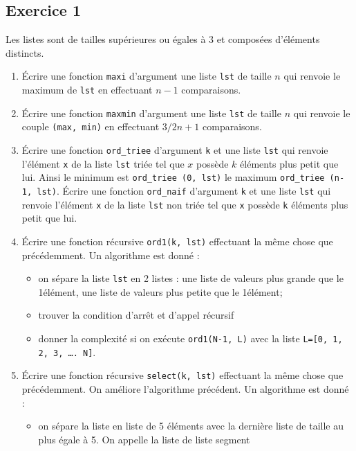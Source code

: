 \documentclass[10pt,fleqn]{article} %
\begin{document}
\begin{multicols}{2}

\subsection*{Exercice 1}

Les listes sont de tailles supérieures ou égales à 3 et composées d’éléments distincts.
\begin{enumerate}
\item Écrire une fonction \texttt{maxi} d’argument une liste \texttt{lst} de taille $n$ qui renvoie le maximum de \texttt{lst} en effectuant $n-1$ comparaisons.
\item Écrire une fonction \texttt{maxmin} d’argument une liste \texttt{lst} de taille $n$ qui renvoie le couple \texttt{(max, min)} en effectuant $3/2n+1$ comparaisons.
\item Écrire une fonction \texttt{ord\_triee} d’argument \texttt{k} et une liste \texttt{lst} qui renvoie l’élément \texttt{x} de la liste \texttt{lst} triée tel que $x$ possède $k$ éléments plus petit que lui. Ainsi le minimum est \texttt{ord\_triee (0, lst)} le maximum \texttt{ord\_triee (n-1, lst)}. Écrire une fonction \texttt{ord\_naif} d’argument \texttt{k} et une liste \texttt{lst} qui renvoie l’élément \texttt{x} de la liste \texttt{lst} non triée tel que \texttt{x} possède \texttt{k} éléments plus petit que lui.
\item Écrire une fonction récursive \texttt{ord1(k, lst)} effectuant la même chose que précédemment. Un algorithme est donné :
\begin{itemize}
\item on sépare la liste \texttt{lst} en 2 listes : une liste de valeurs plus grande que le 1\ier élément, une liste de valeurs plus petite que le 1\ier élément;
\item trouver la condition d’arrêt et d’appel récursif
\item donner la complexité si on exécute \texttt{ord1(N-1, L)} avec la liste \texttt{L=[0, 1, 2, 3, …. N]}.
\end{itemize}
\item Écrire une fonction récursive \texttt{select(k, lst)} effectuant la même chose que précédemment. On améliore l’algorithme précédent. Un algorithme est donné : 
\begin{itemize}
\item on sépare la liste en liste de 5 éléments avec la dernière liste de taille au plus égale à 5. On appelle la liste de liste segment

\end{itemize}
\end{enumerate}
\end{multicols}
\end{document}
